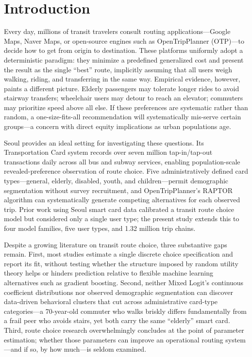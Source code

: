 \section{Introduction}

Every day, millions of transit travelers consult routing
applications---Google Maps, Naver Maps, or open-source engines such as
OpenTripPlanner (OTP)---to decide how to get from origin to destination. These
platforms uniformly adopt a deterministic paradigm: they minimize a predefined
generalized cost and present the result as the single ``best'' route,
implicitly assuming that all users weigh walking, riding, and transferring in
the same way. Empirical evidence, however, paints a different picture. Elderly
passengers may tolerate longer rides to avoid stairway transfers; wheelchair
users may detour to reach an elevator; commuters may prioritize speed above all
else. If these preferences are systematic rather than random, a
one-size-fits-all recommendation will systematically mis-serve certain
groups---a concern with direct equity implications as urban populations age.

Seoul provides an ideal setting for investigating these questions. Its
Transportation Card system records over seven million tap-in/tap-out
transactions daily across all bus and subway services, enabling
population-scale revealed-preference observation of route choice. Five
administratively defined card types---general, elderly, disabled, youth, and
children---permit demographic segmentation without survey recruitment, and
OpenTripPlanner's RAPTOR algorithm \cite{delling2015} can systematically
generate competing alternatives for each observed trip. Prior work using Seoul
smart card data \cite{kim2020} calibrated a transit route choice model but
considered only a single user type; the present study extends this to four
model families, five user types, and 1.32 million trip chains.

Despite a growing literature on transit route choice, three substantive gaps
remain. First, most studies estimate a single discrete choice specification and
report its fit, without testing whether the structure imposed by random utility
theory helps or hinders prediction relative to flexible machine learning
alternatives such as gradient boosting. Second, neither Mixed Logit's
continuous coefficient distributions nor observed demographic segmentation can
discover data-driven behavioral clusters that cut across administrative
card-type categories---a 70-year-old commuter who walks briskly differs
fundamentally from a frail peer who avoids stairs, yet both carry the same
``elderly'' smart card. Third, route choice research overwhelmingly concludes
at the point of parameter estimation; whether those parameters can improve an
operational routing system---and if so, by how much---is seldom examined.

